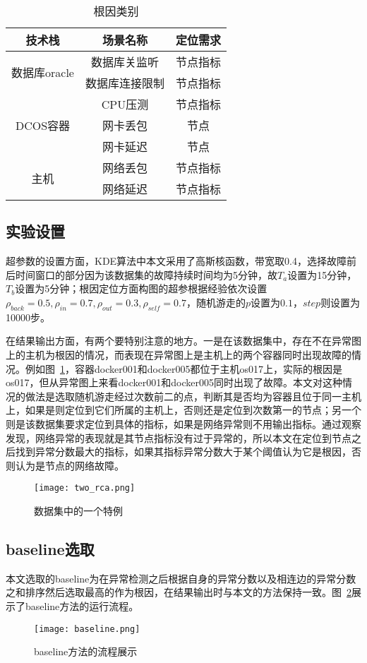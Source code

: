 \begin{table}[htbp]
  \centering
  \begin{tabular}{ccc}
    \toprule
    技术栈 & 场景名称 & 定位需求\\
    \midrule
    \multirow{2}{*}{数据库oracle} & 数据库关监听 & 节点指标\\
     & 数据库连接限制 & 节点指标 \\
    \multirow{3}{*}{DCOS容器} & CPU压测 & 节点指标\\
     & 网卡丢包 & 节点\\
     & 网卡延迟 & 节点\\
    \multirow{2}{*}{主机} & 网络丢包& 节点指标\\
    & 网络延迟 & 节点指标\\
    \bottomrule
  \end{tabular}
  \caption{根因类别}
  \label{tab:error}
\end{table}

\subsection{实验设置}
超参数的设置方面，KDE算法中本文采用了高斯核函数，带宽取0.4，选择故障前后时间窗口的部分因为该数据集的故障持续时间均为5分钟，故$T_a$设置为15分钟，$T_b$设置为5分钟；根因定位方面构图的超参根据经验依次设置$\rho_{back}=0.5, \rho_{in} = 0.7, \rho_{out} = 0.3, \rho_{self} = 0.7$，随机游走的$p$设置为$0.1$，$step$则设置为10000步。

在结果输出方面，有两个要特别注意的地方。一是在该数据集中，存在不在异常图上的主机为根因的情况，而表现在异常图上是主机上的两个容器同时出现故障的情况。例如图~\ref{fig:two:rca}，容器docker001和docker005都位于主机os017上，实际的根因是os017，但从异常图上来看docker001和docker005同时出现了故障。本文对这种情况的做法是选取随机游走经过次数前二的点，判断其是否均为容器且位于同一主机上，如果是则定位到它们所属的主机上，否则还是定位到次数第一的节点；另一个则是该数据集要求定位到具体的指标，如果是网络异常则不用输出指标。通过观察发现，网络异常的表现就是其节点指标没有过于异常的，所以本文在定位到节点之后找到异常分数最大的指标，如果其指标异常分数大于某个阈值认为它是根因，否则认为是节点的网络故障。

\begin{figure}[htbp]
  \centering
  \texttt{[image: two\_rca.png]}
  \caption{数据集中的一个特例}
  \label{fig:two:rca}
\end{figure}


\subsection{baseline选取}
本文选取的baseline为在异常检测之后根据自身的异常分数以及相连边的异常分数之和排序然后选取最高的作为根因，在结果输出时与本文的方法保持一致。图~\ref{fig:baseline}展示了baseline方法的运行流程。
\begin{figure}[htbp]
  \centering
  \texttt{[image: baseline.png]}
  \caption{baseline方法的流程展示}
  \label{fig:baseline}
\end{figure}
